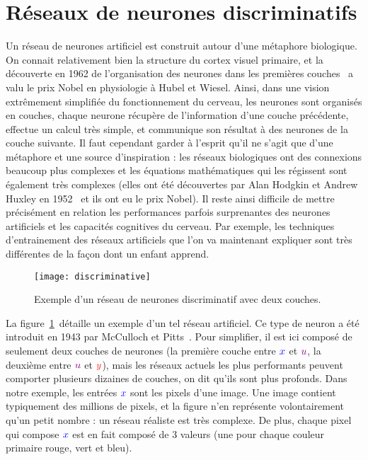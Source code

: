 \section{Réseaux de neurones discriminatifs}

Un réseau de neurones artificiel est construit autour d'une métaphore biologique. 
%
On connait relativement bien la structure du cortex visuel primaire, et la découverte en 1962 de l'organisation des neurones dans les premières couches~\cite{hubel1962receptive} a valu le prix Nobel en physiologie à Hubel et Wiesel. 
%
Ainsi, dans une vision extrêmement simplifiée du fonctionnement du cerveau, les neurones sont organisés en couches, chaque neurone récupère de l'information d'une couche précédente, effectue un calcul très simple, et communique son résultat à des neurones de la couche suivante. 
%
Il faut cependant garder à l'esprit qu'il ne s'agit que d'une métaphore et une source d'inspiration : les réseaux biologiques ont des connexions beaucoup plus complexes et les équations mathématiques qui les régissent sont également très complexes (elles ont été découvertes par Alan Hodgkin et Andrew Huxley en 1952~\cite{hodgkin1952quantitative} et ils ont eu le prix Nobel). 
%
Il reste ainsi difficile de mettre précisément en relation les performances parfois surprenantes des neurones artificiels et les capacités cognitives du cerveau. Par exemple, les techniques d'entrainement des réseaux artificiels que l'on va maintenant expliquer sont très différentes de la façon dont un enfant apprend.  

\begin{figure}\centering
	\texttt{[image: discriminative]}
\caption{\label{fig:discriminative} Exemple d'un réseau de neurones discriminatif avec deux couches.  }
\end{figure}

La figure~\ref{fig:discriminative} détaille un exemple d'un tel réseau artificiel.
%
Ce type de neuron a été introduit en 1943 par McCulloch et Pitts~\cite{mcculloch1943logical}.
%
Pour simplifier, il est ici composé de seulement deux couches de neurones (la première couche entre ${\color{blue} x}$ et ${\color[rgb]{.5,0,.5} u}$, la deuxième entre ${\color[rgb]{.5,0,.5} u}$ et ${\color{red} y}$), mais les réseaux actuels les plus performants peuvent comporter plusieurs dizaines de couches, on dit qu'ils sont plus profonds. 
%
Dans notre exemple, les entrées ${\color{blue} x}$ sont les pixels d'une image. Une image contient typiquement des millions de pixels, et la figure n'en représente volontairement qu'un petit nombre : un réseau réaliste est très complexe. De plus, chaque pixel qui compose ${\color{blue} x}$ est en fait composé de 3 valeurs (une pour chaque couleur primaire rouge, vert et bleu). 

